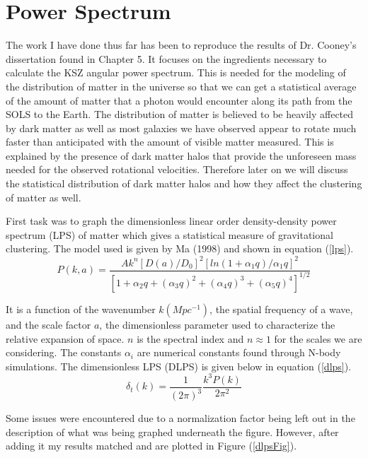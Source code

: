\documentclass[12pt]{article}
\begin{document}
\section{Power Spectrum}

The work I have done thus far has been to reproduce the results of Dr. Cooney’s dissertation found in Chapter 5. It focuses on the ingredients necessary to calculate the KSZ angular power spectrum. This is needed for the modeling of the distribution of matter in the universe so that we can get a statistical average of the amount of matter that a photon would encounter along its path from the SOLS to the Earth. The distribution of matter is believed to be heavily affected by dark matter as well as most galaxies we have observed appear to rotate much faster than anticipated with the amount of visible matter measured. This is explained by the presence of dark matter halos that provide the unforeseen mass needed for the observed rotational velocities. Therefore later on we will discuss the statistical distribution of dark matter halos and how they affect the clustering of matter as well.

First task was to graph the dimensionless linear order density-density power spectrum (LPS) of matter which gives a statistical measure of gravitational clustering. The model used is given by Ma (1998) and shown in equation (\ref{lps}).
\begin{equation} \label{lps}
P(k,a) = \frac{Ak^n [D(a) / D_0]^2 [ln(1+\alpha_1 q) / \alpha_1 q]^2}{[1 + \alpha_2q + (\alpha_3 q)^2 + (\alpha_4 q)^3 + (\alpha_5 q)^4]^{1/2}}
\end{equation} 

It is a function of the wavenumber $k (Mpc^{-1})$, the spatial frequency of a wave, and the scale factor $a$, the dimensionless parameter used to characterize the relative expansion of space. $n$ is the spectral index and $n \approx 1$ for the scales we are considering. The constants $\alpha_i$ are numerical constants found through N-body simulations. The dimensionless LPS (DLPS) is given below in equation (\ref{dlps}).
\begin{equation} \label{dlps}
\delta_t(k) = \frac{1}{(2\pi)^3} \frac{k^3 P(k)}{2\pi^2}
\end{equation}

Some issues were encountered due to a normalization factor being left out in the description of what was being graphed underneath the figure. However, after adding it my results matched and are plotted in Figure (\ref{dlpsFig}).
\end{document}
